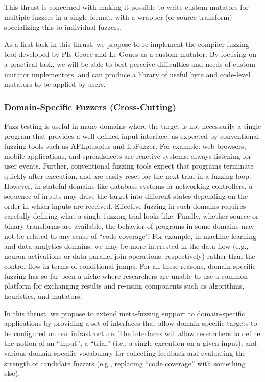 This thrust is concerned with making it possible to write custom mutators for 
multiple fuzzers in a single format, with a wrapper (or source transform) 
specializing this to individual fuzzers.

As a first task in this thrust, we propose to re-implement the compiler-fuzzing 
tool developed by PIs Groce and Le Goues as a custom mutator.  By focusing on a 
practical task, we will be able to best perceive difficulties and needs of 
custom mutator implementors, and can produce a library of useful byte and 
code-level mutators to be applied by users.

\subsubsection{Domain-Specific Fuzzers (Cross-Cutting)}

Fuzz testing is useful in many domains where the target is not necessarily a single program that
provides a well-defined input interface, as expected by conventional fuzzing tools such as
AFLplusplus and libFuzzer. For example: web browsers, mobile applications, and spreadsheets 
are reactive systems, always listening for user events. Further, conventional fuzzing tools 
expect that programs terminate quickly after execution, and are easily reset 
for the next trial in a fuzzing loop. However, in stateful domains like database systems 
or networking controllers, a sequence of inputs may drive the target into different states
depending on the order in which inputs are received. Effective fuzzing in such domains requires
carefully defining what a single fuzzing trial looks like. Finally, whether source or binary 
transforms are available, the behavior of programs in some domains may not be related to
any sense of ``code coverage''. For example, in machine learning and data analytics domains,
we may be more interested in the data-flow (e.g., neuron activations or 
data-parallel join operations, respectively) rather than the control-flow in terms of 
conditional jumps. For all these reasons, domain-specific fuzzing has so far been a niche where
researchers are unable to use a common platform for exchanging results and re-using components
such as algorithms, heuristics, and mutators.

In this thrust, we propose to extend meta-fuzzing support to domain-specific applications by
providing a set of interfaces that allow domain-specific targets to be configured on our
infrastructure. The interfaces will allow researchers to define the notion of an ``input'',
a ``trial'' (i.e., a single execution on a given input), and various domain-specific vocabulary
for collecting feedback and evaluating the strength of candidate fuzzers (e.g., replacing ``code
coverage'' with something else). 

